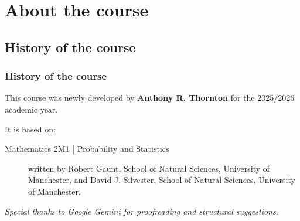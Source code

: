 \section{About the course}

\subsection{History of the course}
\begin{frame}
\frametitle{History of the course}
This course was \alert{newly} developed by \textbf{Anthony R. Thornton} for the 2025/2026 academic year.

It is based on:
\begin{description}
\item[Mathematics 2M1 | Probability and Statistics] written by Robert Gaunt, School of Natural Sciences, University of Manchester,
 and David J. Silvester, School of Natural Sciences, University of Manchester.
\end{description}

\textit{Special thanks to Google Gemini for proofreading and structural suggestions.}
\end{frame}

